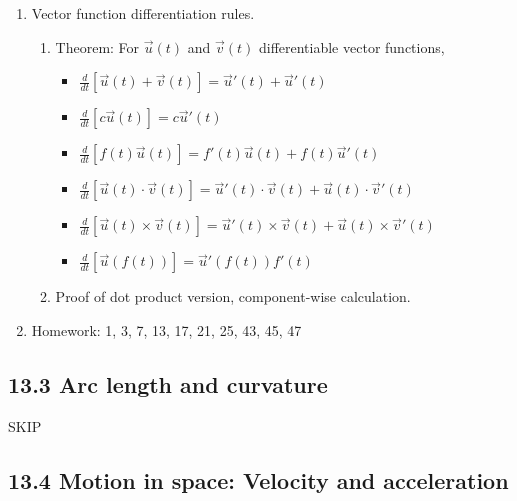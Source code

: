 \documentclass{article}
\newcommand{\ds}{\displaystyle}
\begin{document}
\begin{enumerate}
\item Vector function differentiation rules.
\begin{enumerate}
\item Theorem: For $\vec{u}(t)$ and $\vec{v}(t)$ differentiable vector functions,
\begin{itemize}
\item $\ds \frac{d}{dt} \left[ \vec{u}(t)+\vec{v}(t) \right] = \vec{u}'(t)+\vec{u}'(t)$
\item $\ds \frac{d}{dt} \left[ c\vec{u}(t)\right] = c\vec{u}'(t)$
\item $\ds \frac{d}{dt} \left[ f(t) \vec{u}(t) \right] = f'(t)\vec{u}(t)+f(t)\vec{u}'(t)$
\item $\ds \frac{d}{dt} \left[ \vec{u}(t)\cdot \vec{v}(t) \right] = \vec{u}'(t)\cdot\vec{v}(t)+\vec{u}(t)\cdot\vec{v}'(t)$
\item $\ds \frac{d}{dt} \left[ \vec{u}(t)\times \vec{v}(t) \right] = \vec{u}'(t)\times\vec{v}(t)+\vec{u}(t)\times\vec{v}'(t)$
\item $\ds \frac{d}{dt} \left[ \vec{u}(f(t))\right] = \vec{u}'(f(t)) f'(t)$
\end{itemize}
\item Proof of dot product version, component-wise calculation.
\end{enumerate}

\item Homework: 1, 3, 7, 13, 17, 21, 25, 43, 45, 47

\end{enumerate}

\subsection{13.3 Arc length and curvature}

SKIP

\subsection{13.4 Motion in space: Velocity and acceleration}
\end{document}
